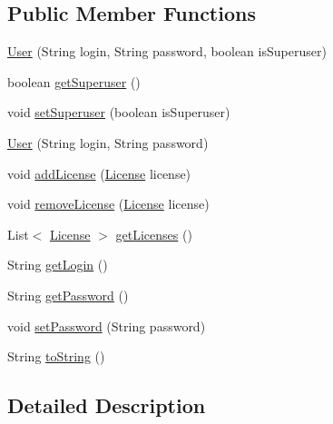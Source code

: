 \subsection*{Public Member Functions}
\begin{DoxyCompactItemize}
\item 
\hyperlink{classes_1_1deusto_1_1server_1_1db_1_1data_1_1_user_a99b61ff1f905036e1aeea2813a2fb1c1}{User} (String login, String password, boolean is\+Superuser)
\item 
boolean \hyperlink{classes_1_1deusto_1_1server_1_1db_1_1data_1_1_user_a3b6d6d064ccfe7e0dc2a7c6c132cdfc0}{get\+Superuser} ()
\item 
void \hyperlink{classes_1_1deusto_1_1server_1_1db_1_1data_1_1_user_a386c51067e68570828d9dcd130e6fe74}{set\+Superuser} (boolean is\+Superuser)
\item 
\hyperlink{classes_1_1deusto_1_1server_1_1db_1_1data_1_1_user_accf4cd75adc5bfc6cd376a1714517ba9}{User} (String login, String password)
\item 
void \hyperlink{classes_1_1deusto_1_1server_1_1db_1_1data_1_1_user_a1eefc1e49d4bf8046f3a7cdbca7f670d}{add\+License} (\hyperlink{classes_1_1deusto_1_1server_1_1db_1_1data_1_1_license}{License} license)
\item 
void \hyperlink{classes_1_1deusto_1_1server_1_1db_1_1data_1_1_user_a5ee17c4a3ab4eceb028a087f96527375}{remove\+License} (\hyperlink{classes_1_1deusto_1_1server_1_1db_1_1data_1_1_license}{License} license)
\item 
List$<$ \hyperlink{classes_1_1deusto_1_1server_1_1db_1_1data_1_1_license}{License} $>$ \hyperlink{classes_1_1deusto_1_1server_1_1db_1_1data_1_1_user_adeddbb54df77d3779f739f27959588e1}{get\+Licenses} ()
\item 
String \hyperlink{classes_1_1deusto_1_1server_1_1db_1_1data_1_1_user_a2bc07e76806b027ef70b5ad8cea5f9fa}{get\+Login} ()
\item 
String \hyperlink{classes_1_1deusto_1_1server_1_1db_1_1data_1_1_user_ac576607b3eae9e9b8c7002d5cd7c1a62}{get\+Password} ()
\item 
void \hyperlink{classes_1_1deusto_1_1server_1_1db_1_1data_1_1_user_a0098f77da63338c8374ea1e5baab28c9}{set\+Password} (String password)
\item 
String \hyperlink{classes_1_1deusto_1_1server_1_1db_1_1data_1_1_user_a494980951c4c71c0a793994b7bcd5101}{to\+String} ()
\end{DoxyCompactItemize}


\subsection{Detailed Description}


